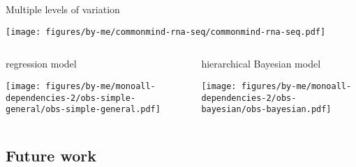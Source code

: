 \documentclass{beamer}
\newcommand{\platefigscale}[0]{0.7}
\begin{document}
\begin{frame}{Multiple levels of variation}
\begin{center}
\texttt{[image: figures/by-me/commonmind-rna-seq/commonmind-rna-seq.pdf]}
\end{center}
\end{frame}

\begin{frame}
\begin{columns}[t]
\begin{column}{0.5\textwidth}
regression model

\texttt{[image: figures/by-me/monoall-dependencies-2/obs-simple-general/obs-simple-general.pdf]}
\end{column}

\begin{column}{0.5\textwidth}
hierarchical Bayesian model

\texttt{[image: figures/by-me/monoall-dependencies-2/obs-bayesian/obs-bayesian.pdf]}
\end{column}
\end{columns}
\end{frame}

\subsection{Future work}
\end{document}
